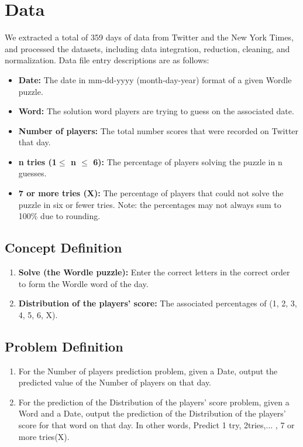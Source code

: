 \documentclass[a4paper]{jpconf}
\begin{document}
\section{Data}
We extracted a total of 359 days of data from Twitter and the New York Times, and processed the datasets, including data integration, reduction, cleaning, and normalization. Data file entry descriptions are as follows:
\begin{itemize}
    \item {\bf Date: }The date in mm-dd-yyyy (month-day-year) format of a given Wordle puzzle.
    \item {\bf Word: }The solution word players are trying to guess on the associated date.
    \item {\bf Number of players: }The total number scores that were recorded on Twitter that day.
    \item {\bf n tries (1$\leq$ n $\leq$ 6): }The percentage of players solving the puzzle in n guesses.
    \item {\bf 7 or more tries (X): }The percentage of players that could not solve the puzzle in six or fewer tries. Note: the percentages may not always sum to 100\% due to rounding.

\end{itemize}

\subsection{Concept Definition}
\begin{enumerate}

    \item {\bf Solve (the Wordle puzzle): }Enter the correct letters in the correct order to form the Wordle word of the day.
    \item {\bf Distribution of the players’ score: }The associated percentages of (1, 2, 3, 4, 5, 6, X).

\end{enumerate}

\subsection{Problem Definition}
\begin{enumerate}

    \item {For the Number of players prediction problem, given a Date, output the predicted value of the Number of players on that day.}
    \item {For the prediction of the Distribution of the players' score problem, given a Word and a Date, output the prediction of the Distribution of the players' score for that word on that day. In other words, Predict 1 try, 2tries,... , 7 or more tries(X).}

\end{enumerate}
\end{document}
